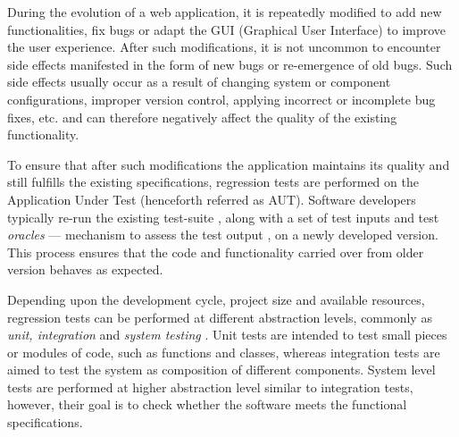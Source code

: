 During the evolution of a web application, it is repeatedly modified to add new functionalities, fix bugs or adapt the GUI (Graphical User Interface) to improve the user experience. After such modifications, it is not uncommon to encounter side effects manifested in the form of new bugs or re-emergence of old bugs. Such side effects usually occur as a result of changing system or component configurations, improper version control, applying incorrect or incomplete bug fixes, etc. and can therefore negatively affect the quality of the existing functionality. 

To ensure that after such modifications the application maintains its quality and still fulfills the existing specifications, regression tests are performed on the Application Under Test (henceforth referred as AUT). Software developers typically re-run the existing test-suite \cite{rothermel2001prioritizing}, \cite{elbaum2000prioritizing} along with a set of test inputs and test \textit{oracles} — mechanism to assess the test output \cite{1240304}, on a newly developed version. This process ensures that the code and functionality carried over from older version behaves as expected.

Depending upon the development cycle, project size and available resources, regression tests can be performed at different abstraction levels, commonly as \textit{unit, integration} and \textit{system testing} \cite{Mpezze}. Unit tests are intended to test small pieces or modules of code, such as functions and classes, whereas integration tests are aimed to test the system as composition of different components. System level tests are performed at higher abstraction level similar to integration tests, however, their goal is to check whether the software meets the functional specifications. 

